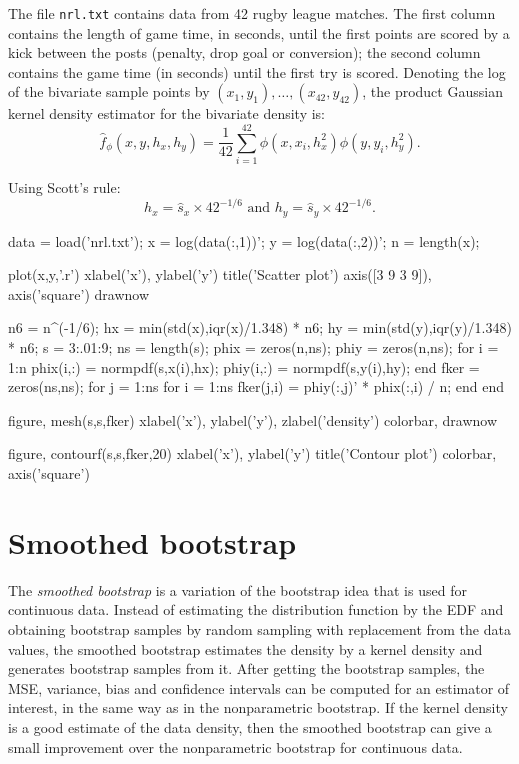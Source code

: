 \begin{labwork}
The file {\tt nrl.txt} contains data from 42 rugby league matches.  The first column contains the length of game time, in seconds, until the first points are scored by a kick between the posts (penalty, drop goal or conversion); the second column contains the game time (in seconds) until the first try is scored. Denoting the log of the bivariate sample points by $(x_1,y_1),\ldots,(x_42,y_42)$, the product Gaussian kernel density estimator for the bivariate density is:
$$\hat{f}_\phi(x,y,h_x,h_y)=\frac{1}{42}\sum^{42}_{i=1}\phi(x,x_i,h^2_x)\phi(y,y_i,h_y^2).$$

Using Scott's rule:
$$h_x=\hat{s}_x\times 42^{-1/6} \textrm{  and   }h_y=\hat{s}_y\times 42^{-1/6}.$$
\begin{VrbM}
data = load('nrl.txt');
x = log(data(:,1))';
y = log(data(:,2))';
n = length(x);

plot(x,y,'.r')
xlabel('x'), ylabel('y')
title('Scatter plot')
axis([3 9 3 9]), axis('square')
drawnow

n6 = n^(-1/6);
hx = min(std(x),iqr(x)/1.348) * n6;
hy = min(std(y),iqr(y)/1.348) * n6;
s = 3:.01:9;
ns = length(s);
phix = zeros(n,ns);
phiy = zeros(n,ns);
for i = 1:n
    phix(i,:) = normpdf(s,x(i),hx);
    phiy(i,:) = normpdf(s,y(i),hy);
end
fker = zeros(ns,ns);
for j = 1:ns
    for i = 1:ns
        fker(j,i) = phiy(:,j)' * phix(:,i) / n;
    end
end

figure, mesh(s,s,fker)
xlabel('x'), ylabel('y'), zlabel('density')
colorbar, drawnow

figure, contourf(s,s,fker,20)
xlabel('x'), ylabel('y')
title('Contour plot')
colorbar, axis('square')
\end{VrbM}
\end{labwork}

\section{Smoothed bootstrap}
The {\it smoothed bootstrap} is a variation of the bootstrap idea that is used for continuous data. Instead of estimating the distribution function by the EDF and obtaining bootstrap samples by random sampling with replacement from the data values, the smoothed bootstrap estimates the density by a kernel density and generates bootstrap samples from it. After getting the bootstrap samples, the MSE, variance, bias and confidence intervals can be computed for an estimator of interest, in the same way as in the nonparametric bootstrap. If the kernel density is a good estimate of the data density, then the smoothed bootstrap can give a small improvement over the nonparametric bootstrap for continuous data.

